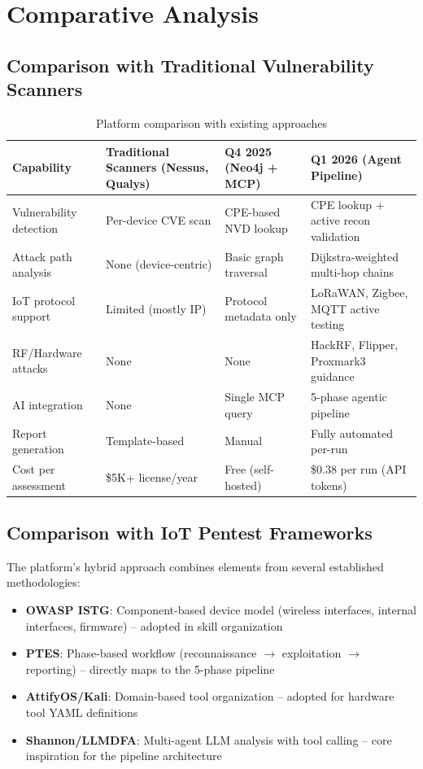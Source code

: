 \documentclass[11pt,a4paper]{article}
\begin{document}
\section{Comparative Analysis}

\subsection{Comparison with Traditional Vulnerability Scanners}

\begin{table}[H]
\centering
\begin{tabular}{@{}lp{3.5cm}p{3.5cm}p{3.5cm}@{}}
\toprule
\textbf{Capability} & \textbf{Traditional Scanners} (Nessus, Qualys) & \textbf{Q4 2025} (Neo4j + MCP) & \textbf{Q1 2026} (Agent Pipeline) \\
\midrule
Vulnerability detection & Per-device CVE scan & CPE-based NVD lookup & CPE lookup + active recon validation \\
Attack path analysis & None (device-centric) & Basic graph traversal & Dijkstra-weighted multi-hop chains \\
IoT protocol support & Limited (mostly IP) & Protocol metadata only & LoRaWAN, Zigbee, MQTT active testing \\
RF/Hardware attacks & None & None & HackRF, Flipper, Proxmark3 guidance \\
AI integration & None & Single MCP query & 5-phase agentic pipeline \\
Report generation & Template-based & Manual & Fully automated per-run \\
Cost per assessment & \$5K+ license/year & Free (self-hosted) & \$0.38 per run (API tokens) \\
\bottomrule
\end{tabular}
\caption{Platform comparison with existing approaches}
\label{tab:comparison}
\end{table}

\subsection{Comparison with IoT Pentest Frameworks}

The platform's hybrid approach combines elements from several established methodologies:

\begin{itemize}
    \item \textbf{OWASP ISTG}: Component-based device model (wireless interfaces, internal interfaces, firmware) -- adopted in skill organization
    \item \textbf{PTES}: Phase-based workflow (reconnaissance $\rightarrow$ exploitation $\rightarrow$ reporting) -- directly maps to the 5-phase pipeline
    \item \textbf{AttifyOS/Kali}: Domain-based tool organization -- adopted for hardware tool YAML definitions
    \item \textbf{Shannon/LLMDFA}: Multi-agent LLM analysis with tool calling -- core inspiration for the pipeline architecture
\end{itemize}
\end{document}
